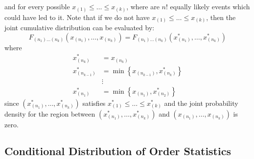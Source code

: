 \documentclass[11pt]{report} %
\begin{document}
and for every possible $x_{\left(1\right)} \leq \dots \leq x_{\left(k\right)}$, where are $n!$ equally likely events which could have led to it. Note that if we do not have $x_{\left(1\right)} \leq \dots \leq x_{\left(k\right)}$, then the joint cumulative distribution can be evaluated by:
\begin{equation}
F_{\left(n_{1}\right)\dots\left(n_{k}\right)}\left(x_{\left(n_{1}\right)}, \dots, x_{\left(n_{k}\right)}\right) = F_{\left(n_{1}\right)\dots\left(n_{k}\right)}\left(x_{\left(n_{1}\right)}^{*}, \dots, x_{\left(n_{k}\right)}^{*}\right)
\end{equation}
where
\begin{align}
x_{\left(n_{k}\right)}^{*} &= x_{\left(n_{k}\right)} \\
x_{\left(n_{k - 1}\right)}^{*} &= \min\left\{x_{\left(n_{k - 1}\right)}, x_{\left(n_{k}\right)}^{*}\right\} \\
&\vdots \\
x_{\left(n_{1}\right)}^{*} &= \min\left\{x_{\left(n_{1}\right)}, x_{\left(n_{2}\right)}^{*}\right\}
\end{align}
since $\left(x_{\left(n_{1}\right)}^{*}, \dots, x_{\left(n_{k}\right)}^{*}\right)$ satisfies $x_{\left(1\right)}^{*} \leq \dots \leq x_{\left(k\right)}^{*}$ and the joint probability density for the region between $\left(x_{\left(n_{1}\right)}^{*}, \dots, x_{\left(n_{k}\right)}^{*}\right)$ and $\left(x_{\left(n_{1}\right)}, \dots, x_{\left(n_{k}\right)}\right)$ is zero.


\subsection{Conditional Distribution of Order Statistics}
\end{document}
